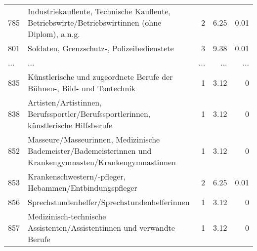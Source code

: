 \begin{longtable}{lXrrr}
        785 & \multicolumn{1}{X}{Industriekaufleute, Technische Kaufleute, Betriebswirte/Betriebswirtinnen (ohne Diplom), a.n.g.} & %
          \num{2} &
          \num[round-mode=places,round-precision=2]{6,25} &
          \num[round-mode=places,round-precision=2]{0,01} \\
        801 & \multicolumn{1}{X}{Soldaten, Grenzschutz-, Polizeibedienstete} & %
          \num{3} &
          \num[round-mode=places,round-precision=2]{9,38} &
          \num[round-mode=places,round-precision=2]{0,01} \\
       ... & ... & ... & ... & ... \\
        835 & \multicolumn{1}{X}{Künstlerische und zugeordnete Berufe der Bühnen-, Bild- und Tontechnik} & %
          \num{1} &
          \num[round-mode=places,round-precision=2]{3,12} &
          \num[round-mode=places,round-precision=2]{0} \\

        838 & \multicolumn{1}{X}{Artisten/Artistinnen, Berufssportler/Berufssportlerinnen, künstlerische Hilfsberufe} & %
          \num{1} &
          \num[round-mode=places,round-precision=2]{3,12} &
          \num[round-mode=places,round-precision=2]{0} \\

        852 & \multicolumn{1}{X}{Masseure/Masseurinnen, Medizinische Bademeister/Bademeisterinnen und Krankengymnasten/Krankengymnastinnen} & %
          \num{1} &
          \num[round-mode=places,round-precision=2]{3,12} &
          \num[round-mode=places,round-precision=2]{0} \\

        853 & \multicolumn{1}{X}{Krankenschwestern/-pfleger, Hebammen/Entbindungspfleger} & %
          \num{2} &
          \num[round-mode=places,round-precision=2]{6,25} &
          \num[round-mode=places,round-precision=2]{0,01} \\

        856 & \multicolumn{1}{X}{Sprechstundenhelfer/Sprechstundenhelferinnen} & %
          \num{1} &
          \num[round-mode=places,round-precision=2]{3,12} &
          \num[round-mode=places,round-precision=2]{0} \\

        857 & \multicolumn{1}{X}{Medizinisch-technische Assistenten/Assistentinnen und verwandte Berufe} & %
          \num{1} &
          \num[round-mode=places,round-precision=2]{3,12} &
          \num[round-mode=places,round-precision=2]{0} \\


\end{longtable}
